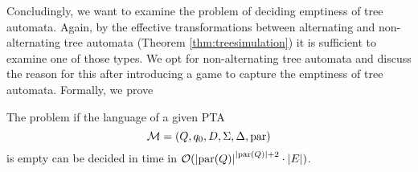 Concludingly, we want to examine the problem of deciding emptiness of tree
automata. Again, by the effective transformations between alternating and
non-alternating tree automata (Theorem \ref{thm:treesimulation}) it is
sufficient to examine one of those types. We opt for non-alternating tree
automata and discuss the reason for this after introducing a game to capture
the emptiness of tree automata. Formally, we prove
\begin{theorem}
  \cite[Theorem 21]{AutoInfObj} \cite[Theorem 7.25]{AutoLogInfGames}
  The problem if the language of a given \ac{PTA}
  \begin{equation*}
    \mathcal{M} = \left(Q, q_{0}, D, \Sigma, \Delta, \operatorname{par}\right)
  \end{equation*}
  is empty can be decided in time in 
  $\mathcal{O}(\left\vert{\operatorname{par}(Q)}\right\vert^{\left\vert{\operatorname{par}(Q)}\right\vert+2}\cdot\left\vert{E}\right\vert)$.
\end{theorem}
